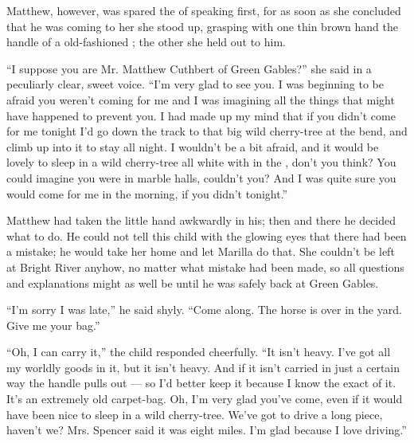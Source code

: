\documentclass[troisieme]{fiche}
\begin{document}
\begin{texte}
Matthew, however, was spared the  of speaking first, for as
soon as she concluded that he was coming to her she stood up, grasping with one thin brown
hand the handle of a  old-fashioned
; the other she held out to him.

``I suppose you are Mr. Matthew Cuthbert of Green Gables?'' she said in a peculiarly clear,
sweet voice. ``I'm very glad to see you. I was beginning to be afraid you weren't coming for
me and I was imagining all the things that might have happened to prevent you. I had made up
my mind that if you didn't come for me tonight I'd go down the track to that big wild
cherry-tree at the bend, and climb up into it to stay all night. I wouldn't be a bit afraid,
and it would be lovely to sleep in a wild cherry-tree all white with
 in the , don't you
think? You could imagine you were  in marble halls, couldn't
you? And I was quite sure you would come for me in the morning, if you didn't tonight.''

Matthew had taken the  little hand awkwardly in his; then and
there he decided what to do. He could not tell this child with the glowing eyes that there had
been a mistake; he would take her home and let Marilla do that. She couldn't be left at Bright
River anyhow, no matter what mistake had been made, so all questions and explanations might as
well be  until he was safely back at Green Gables.

``I'm sorry I was late,'' he said shyly. ``Come along. The horse is over in the yard. Give me
your bag.''

``Oh, I can carry it,'' the child responded cheerfully. ``It isn't heavy. I've got all my
worldly goods in it, but it isn't heavy. And if it isn't carried in just a certain way the
handle pulls out --- so I'd better keep it because I know the exact
 of it. It's an extremely old carpet-bag. Oh, I'm very
glad you've come, even if it would have been nice to sleep in a wild cherry-tree. We've got to
drive a long piece, haven't we? Mrs. Spencer said it was eight miles. I'm glad because I love
driving.''
\end{texte}
\end{document}
